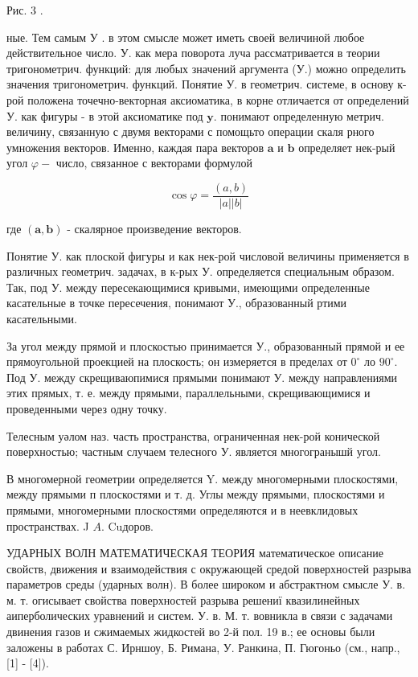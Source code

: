 \documentclass[10pt]{article}
\begin{document}
Рис. 3 .



ные. Тем самым У . в этом смысле может иметь своей величиной любое действительное число. У. как мера поворота луча рассматривается в теории тригонометрич. функций: для любых значений аргумента (У.) можно определить значения тригонометрич. функций. Понятие У. в геометрич. системе, в основу к-рой положена точечно-векторная аксиоматика, в корне отличается от определений У. как фигуры - в этой аксиоматике под $\mathbf{y}$. понимают определенную метрич. величину, связанную с двумя векторами с помощьто операции скаля рного умножения векторов. Именно, каждая пара векторов $\boldsymbol{a}$ и $\boldsymbol{b}$ определяет нек-рый угол $\varphi-$ число, связанное с векторами формулой



\[

\cos \varphi=\frac{(a, b)}{|a||b|}

\]



где $(\boldsymbol{a}, \boldsymbol{b})$ - скалярное произведение векторов.



Понятие У. как плоской фигуры и как нек-рой числовой величины применяется в различных геометрич. задачах, в к-рых У. определяется специальным образом. Так, под У. между пересекающимися кривыми, имеющими определенные касательные в точке пересечения, понимают У., образованный ртими касательными.



За угол между прямой и плоскостью принимается У., образованный прямой и ее прямоугольной проекцией на плоскость; он измеряется в пределах от $0^{\circ}$ ло $90^{\circ}$. Под У. между скрещиваюпимися прямыми понимают У. между направлениями этих прямых, т. е. между прямыми, параллельными, скрещивающимися и проведенными через одну точку.



Телесным уәлом наз. часть пространства, ограниченная нек-рой конической поверхностью; частным случаем телесного У. является многогранышй угол.



В многомерной геометрии определяется $\mathrm{Y}$. между многомерными плоскостями, между прямыми п плоскостями и т. д. Углы между прямыми, плоскостями и прямыми, многомерными плоскостями определяются и в неевклидовых пространствах. J $A$. Cuдоров.



УДАРНЫХ ВОЛН МАТЕМАТИЧЕСКАЯ ТЕОРИЯ математическое описание свойств, движения и взаимодействия с окружающей средой поверхностей разрыва параметров среды (ударных волн). В более широком и абстрактном смысле У. в. м. т. огисывает свойства поверхностей разрыва решениї квазилинейных аиперболических уравнений и систем. У. в. М. т. вовникла в связи с задачами двинения газов и сжимаемых жидкостей во 2-й пол. 19 в.; ее основы были заложены в работах С. Ирншоу, Б. Римана, У. Ранкина, П. Гюгоньо (см., напр., [1] - [4]).
\end{document}
